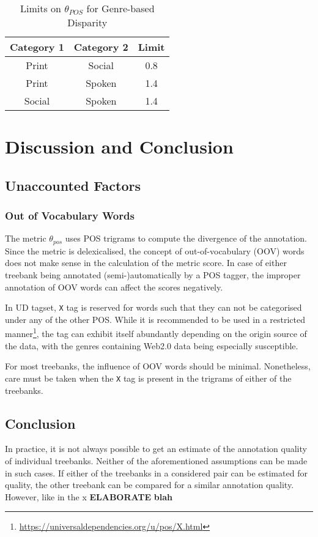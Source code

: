 \begin{table}[h]
    \centering
    \begin{tabular}{|c|c|c|}
    \hline
    \textbf{Category 1} & \textbf{Category 2} & \textbf{Limit} \\
    \hline
    Print & Social & 0.8 \\
    Print & Spoken & 1.4 \\
    Social & Spoken & 1.4 \\
    \hline
    \end{tabular}
    \caption{Limits on \(\theta_{POS}\) for Genre-based Disparity}
    \label{tab:thetapos_genre}
\end{table}

\section{Discussion and Conclusion}
\label{sec:pos-harmony-conclusion}

\subsection{Unaccounted Factors}
\subsubsection{Out of Vocabulary Words}

The metric \(\theta_{pos}\) uses POS trigrams to compute the divergence of the annotation. Since the metric is delexicalised, the concept of out-of-vocabulary (OOV) words does not make sense in the calculation of the metric score. In case of either treebank being annotated (semi-)automatically by a POS tagger, the improper annotation of OOV words can affect the scores negatively.

In UD tagset, \verb|X| tag is reserved for words such that they can not be categorised under any of the other POS. While it is recommended to be used in a restricted manner\footnote{\url{https://universaldependencies.org/u/pos/X.html}}, the tag can exhibit itself abundantly depending on the origin source of the data, with the genres containing Web2.0 data being especially susceptible.

For most treebanks, the influence of OOV words should be minimal. Nonetheless, care must be taken when the \verb|X| tag is present in the trigrams of either of the treebanks.

\subsection{Conclusion}

In practice, it is not always possible to get an estimate of the annotation quality of individual treebanks. Neither of the aforementioned assumptions can be made in such cases. If either of the treebanks in a considered pair can be estimated for quality, the other treebank can be compared for a similar annotation quality. However, like in the x 
\textbf{ELABORATE}
\textbf{blah}